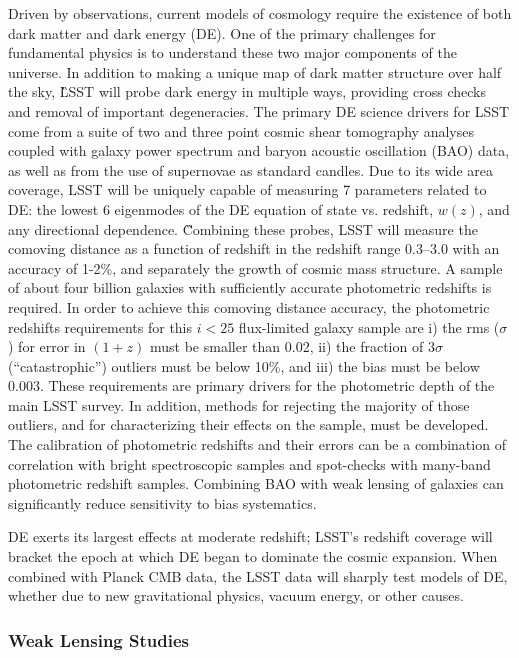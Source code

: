 Driven by observations, current models of cosmology require the existence
of both dark matter and dark energy (DE). One of the primary challenges for
fundamental physics is to understand these two major components of the
universe. In addition to making a unique map of dark matter structure over
half the sky, \G{LSST will probe dark energy in multiple ways, providing cross
checks and removal of important degeneracies.}
The primary DE science drivers for LSST come from a suite of two
and three point cosmic shear tomography analyses coupled with galaxy power
spectrum and baryon acoustic oscillation (BAO) data, as well as from the
use of supernovae as standard candles. Due to its wide area coverage, LSST
will be uniquely capable of measuring 7 parameters related to DE:
the lowest 6 eigenmodes of the DE equation of state vs. redshift, $w(z)$, and
any directional dependence.
\G{Combining these probes, LSST will measure the comoving distance as a function
of redshift in the redshift range 0.3--3.0 with an accuracy of 1-2\%, and
separately the growth of cosmic mass structure.
A sample of about four billion galaxies with sufficiently accurate photometric
redshifts is required. In order to achieve this comoving distance accuracy,
the photometric redshifts requirements for this $i<25$
flux-limited galaxy sample are i) the rms ($\sigma$) for error in $(1+z)$ must be
smaller than 0.02, ii) the fraction of $3\sigma$ (``catastrophic'') outliers must be
below 10\%, and iii) the bias must be below 0.003. These requirements are
primary drivers for the photometric depth of the main LSST survey. In addition,
methods for rejecting the majority of those outliers, and for characterizing their
effects on the sample, must be developed. The calibration of photometric redshifts
and their errors can be a combination of correlation with bright spectroscopic samples
and spot-checks with many-band photometric redshift samples. Combining BAO with
weak lensing of galaxies can significantly reduce sensitivity to bias systematics.
}

DE exerts its largest effects at moderate
redshift; LSST's redshift coverage will bracket the epoch at which DE began
to dominate the cosmic expansion. When combined with Planck CMB data, the
LSST data will sharply test models of DE, whether due to new
gravitational physics, vacuum energy, or other causes.




\subsubsection{Weak Lensing Studies}
\label{WLstudies}

